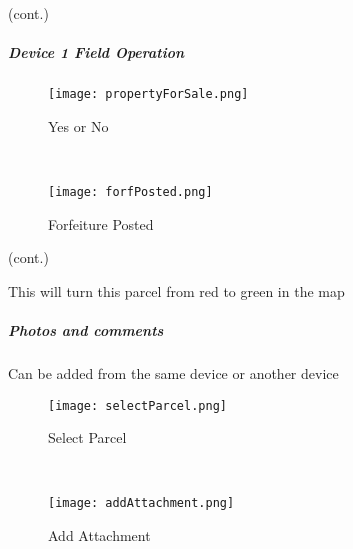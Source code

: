  {\footnotesize (cont.)}
 \vspace{.5in}

 \vspace{3in}



 \clearpage

 \subparagraph*{Device 1 Field Operation}
 \begin{wrapfigure}{r}{0.6\textwidth}
 \centering
     \texttt{[image: propertyForSale.png]}
 \caption{Yes or No}
  \vspace{.05in}

 \HRule \\[.4cm] %
 \vspace{.1in} 
 
\texttt{[image: forfPosted.png]} %
 \caption{Forfeiture Posted}

 
 \end{wrapfigure}

 {\footnotesize (cont.)}
 \vspace{.5in}

 \vspace{4in} 
 

\noindent This will turn this parcel from red to green in the map

 \clearpage
 \subparagraph*{Photos and comments}
 
 \noindent Can be added from the same device or another device

 \begin{wrapfigure}{r}{0.6\textwidth}
 \centering
     \texttt{[image: selectParcel.png]}
 \caption {Select Parcel}
 \vspace{.05in}

 \HRule \\[.4cm] %
 \vspace{.1in}

     \texttt{[image: addAttachment.png]}
 \caption{Add Attachment}
 \vspace{.05in}

 \end{wrapfigure}

